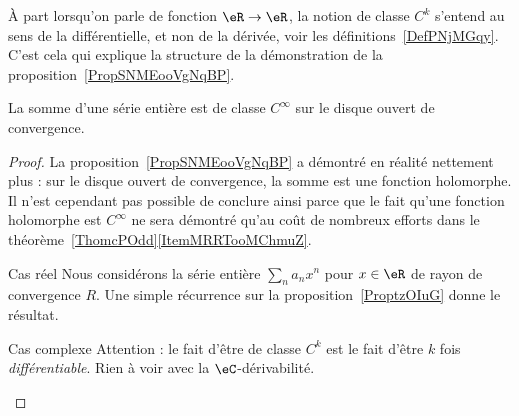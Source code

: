 \begin{remark}
	À part lorsqu'on parle de fonction \( \eR\to \eR\), la notion de classe \( C^k\) s'entend au sens de la différentielle, et non de la dérivée, voir les définitions~\ref{DefPNjMGqy}. C'est cela qui explique la structure de la démonstration de la proposition~\ref{PropSNMEooVgNqBP}.
\end{remark}

\begin{corollary}       \label{CorCBYHooQhgara}
	La somme d'une série entière est de classe \( C^{\infty}\) sur le disque ouvert de convergence.
\end{corollary}

\begin{proof}
	La proposition~\ref{PropSNMEooVgNqBP} a démontré en réalité nettement plus : sur le disque ouvert de convergence, la somme est une fonction holomorphe. Il n'est cependant pas possible de conclure ainsi parce que le fait qu'une fonction holomorphe est \( C^{\infty}\) ne sera démontré qu'au coût de nombreux efforts dans le théorème~\ref{ThomcPOdd}\ref{ItemMRRTooMChmuZ}.

	\begin{subproof}
		\item[Cas réel]
		Nous considérons la série entière \( \sum_na_nx^n\) pour \( x\in \eR\) de rayon de convergence \( R\). Une simple récurrence sur la proposition~\ref{ProptzOIuG} donne le résultat.
		\item[Cas complexe]
		Attention : le fait d'être de classe \( C^k\) est le fait d'être \( k\) fois \emph{différentiable}. Rien à voir avec la \( \eC\)-dérivabilité.


\end{subproof}
\end{proof}

